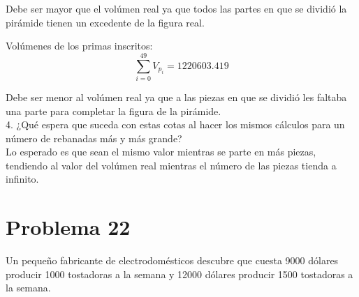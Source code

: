 \documentclass[12pt]{article}
\begin{document}
Debe ser mayor que el volúmen real ya que todos las partes en que se dividió la pirámide tienen un excedente de la figura real.

Volúmenes de los primas inscritos:
\[
\sum_{i=0}^{49} V_{p_i} = 1220603.419      
\]

Debe ser menor al volúmen real ya que a las piezas en que se dividió les faltaba una parte para completar la figura de la pirámide.
\\
4. ¿Qué espera que suceda con estas cotas al hacer los mismos cálculos para un número de
rebanadas más y más grande?
\\
Lo esperado es que sean el mismo valor mientras se parte en más piezas, tendiendo al valor del volúmen real mientras el número de las piezas tienda a infinito.
\clearpage
\section{Problema 22}
Un pequeño fabricante de electrodomésticos descubre que
cuesta 9000 dólares producir 1000 tostadoras a la semana y 12000 dólares producir 1500 tostadoras a la semana.
\end{document}
